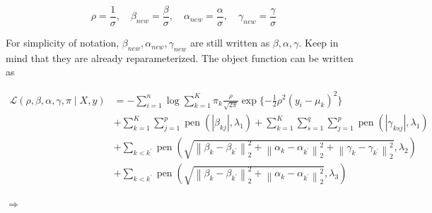 \documentclass[12pt, a4paper, oneside]{article}
\numberwithin{equation}{section}
\begin{document}
\begin{equation}
\rho = \frac{1}{\sigma},\quad \beta_{new} = \frac{\beta}{\sigma}, \quad \alpha_{new} = \frac{\alpha}{\sigma}, \quad \gamma_{new} = \frac{\gamma}{\sigma}
\end{equation}

For simplicity of notation, $\beta_{new}, \alpha_{new}, \gamma_{new}$ are still written as $\beta, \alpha, \gamma$. Keep in mind that they are already reparameterized. The object function can be written as

\begin{equation}
	\label{eq:obj2}
	\begin{aligned}
		\mathcal{L}(\rho, \beta, \alpha, \gamma, \pi \mid X, y)
 		&=-\sum_{i=1}^{n} \log \sum_{k=1}^{K} \pi_{k} \frac{\rho}{\sqrt{2\pi}} \exp\{-\frac{1}{2}\rho^2(y_i - \mu_k)^2\} \\
 		&+\sum_{k=1}^{K} \sum_{j=1}^{p} \operatorname{pen}\left(\left|\beta_{kj}\right|, \lambda_{1}\right)+\sum_{k=1}^{K} \sum_{s=1}^{q} \sum_{j=1}^{p} \operatorname{pen}\left(\left|\gamma_{ksj}\right|, \lambda_{1}\right) \\
 		&+\sum_{k<k^{\prime}} \operatorname{pen}\left(\sqrt{\left\|\beta_k-\beta_{k^\prime}\right\|_{2}^{2}+\left\|\alpha_k-\alpha_{k^\prime}\right\|_{2}^{2}+\left\|\gamma_k-\gamma_{k^\prime}\right\|_{2}^{2}}, \lambda_{2}\right) \\
 		&+\sum_{k<k^{\prime}} \operatorname{pen}\left(\sqrt{\left\|\beta_k-\beta_{k^\prime}\right\|_{2}^{2}+\left\|\alpha_k-\alpha_{k^\prime}\right\|_{2}^{2}}, \lambda_{3}\right)
	\end{aligned}
\end{equation}

$\Rightarrow$
\end{document}
